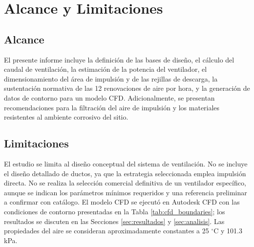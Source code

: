 \section{Alcance y Limitaciones}

\subsection{Alcance}

El presente informe incluye la definición de las bases de diseño, el cálculo del caudal de ventilación, la estimación de la potencia del ventilador, el dimensionamiento del área de impulsión y de las rejillas de descarga, la sustentación normativa de las 12 renovaciones de aire por hora, y la generación de datos de contorno para un modelo CFD. Adicionalmente, se presentan recomendaciones para la filtración del aire de impulsión y los materiales resistentes al ambiente corrosivo del sitio.

\subsection{Limitaciones}

El estudio se limita al diseño conceptual del sistema de ventilación. No se incluye el diseño detallado de ductos, ya que la estrategia seleccionada emplea impulsión directa. No se realiza la selección comercial definitiva de un ventilador específico, aunque se indican los parámetros mínimos requeridos y una referencia preliminar a confirmar con catálogo. El modelo CFD se ejecutó en Autodesk CFD con las condiciones de contorno presentadas en la Tabla \ref{tab:cfd_boundaries}; los resultados se discuten en las Secciones \ref{sec:resultados} y \ref{sec:analisis}. Las propiedades del aire se consideran aproximadamente constantes a 25 $^{\circ}$C y 101.3 kPa.
